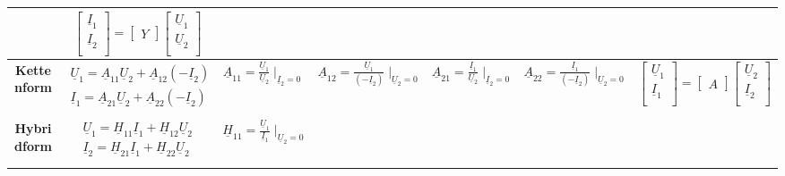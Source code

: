 \begin{sidewaystable}
\begin{tabular}{| c | c | c | c | c | c | c |}
			&$ \begin{bmatrix}
					\underline{I}_{1}\\
					\underline{I}_{2}\\
				\end{bmatrix}
				=
				\begin{bmatrix}
					Y
				\end{bmatrix}
				\begin{bmatrix}
					\underline{U}_{1}\\
					\underline{U}_{2}\\
				\end{bmatrix}$\\
		\hline
			\textbf{Kettenform}
			& $ \begin{matrix}
					\underline{U}_{1}=\underline{A}_{11}\underline{U}_{2}+\underline{A}_{12}(-\underline{I}_{2})\\
					\underline{I}_{1}=\underline{A}_{21}\underline{U}_{2}+\underline{A}_{22}(-\underline{I}_{2})\\
					\end{matrix}$
			& $\underline{A}_{11}=\frac{\underline{U}_{1}}{\underline{U}_{2}} \mid_{\underline{I}_2=0}$
			& $\underline{A}_{12}=\frac{\underline{U}_{1}}{(-\underline{I}_{2})}
			\mid_{\underline{U}_2=0}$ & $\underline{A}_{21}=\frac{\underline{I}_{1}}{\underline{U}_{2}} \mid_{\underline{I}_2=0}$
			& $\underline{A}_{22}=\frac{\underline{I}_{1}}{(-\underline{I}_{2})}
			\mid_{\underline{U}_2=0}$ & $ \begin{bmatrix}
					\underline{U}_{1}\\
					\underline{I}_{1}\\
				\end{bmatrix}
				=
				\begin{bmatrix}
					A
				\end{bmatrix}
				\begin{bmatrix}
					\underline{U}_{2}\\
					\underline{I}_{2}\\
				\end{bmatrix}$\\
		\hline
			\textbf{Hybridform}
			& $ \begin{matrix}
					\underline{U}_{1}=\underline{H}_{11}\underline{I}_{1}+\underline{H}_{12}\underline{U}_{2}\\
					\underline{I}_{2}=\underline{H}_{21}\underline{I}_{1}+\underline{H}_{22}\underline{U}_{2}\\
				\end{matrix}$
			& $\underline{H}_{11}=\frac{\underline{U}_{1}}{\underline{I}_{1}} \mid_{\underline{U}_2=0}$

\end{tabular}
\end{sidewaystable}
